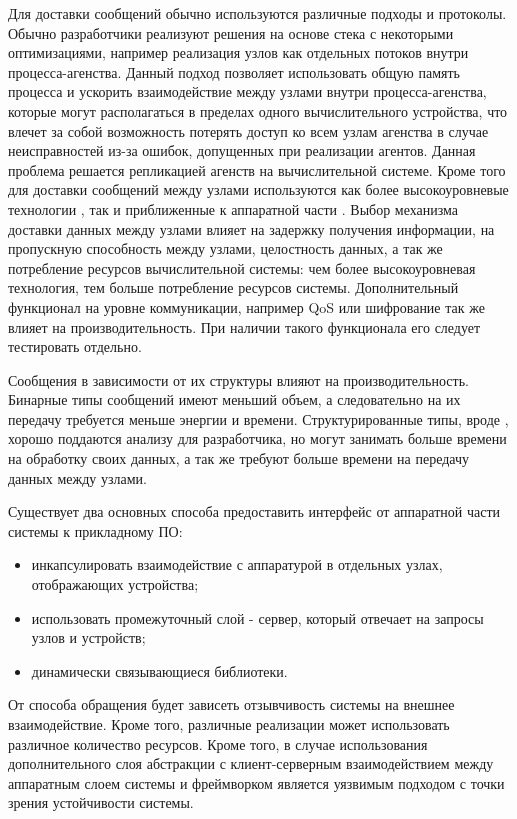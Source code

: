 \begin{description}[noitemsep]
	\item [Протоколы коммуникации.] Для доставки сообщений обычно используются различные подходы и протоколы. Обычно разработчики реализуют решения на основе стека  с некоторыми оптимизациями, например реализация узлов как отдельных потоков внутри процесса-агенства. Данный подход позволяет использовать общую память процесса и ускорить взаимодействие между узлами внутри процесса-агенства, которые могут располагаться в пределах одного вычислительного устройства, что влечет за собой возможность потерять доступ ко всем узлам агенства в случае неисправностей из-за ошибок, допущенных при реализации агентов. Данная проблема решается репликацией агенств на вычислительной системе. Кроме того для доставки сообщений между узлами используются как более высокоуровневые технологии , так и приближенные к аппаратной части . Выбор механизма доставки данных между узлами влияет на задержку получения информации, на пропускную способность между узлами, целостность данных, а так же потребление ресурсов вычислительной системы: чем более высокоуровневая технология, тем больше потребление ресурсов системы. Дополнительный функционал на уровне коммуникации, например QoS или шифрование так же влияет на производительность. При наличии такого функционала его следует тестировать отдельно.

	\item [Формат сообщений.] Сообщения в зависимости от их структуры влияют на производительность. Бинарные типы сообщений имеют меньший объем, а следовательно на их передачу требуется меньше энергии и времени. Структурированные типы, вроде , хорошо поддаются анализу для разработчика, но могут занимать больше времени на обработку своих данных, а так же требуют больше времени на передачу данных между узлами.

	\item [Способ взаимодействия с аппаратурой.] Существует два основных способа предоставить интерфейс от аппаратной части системы к прикладному ПО:
	\begin{itemize}[noitemsep]
		\item инкапсулировать взаимодействие с аппаратурой в отдельных узлах, отображающих устройства;
		\item использовать промежуточный слой - сервер, который отвечает на запросы узлов и устройств;
		\item динамически связывающиеся библиотеки.
	\end{itemize}
	
	От способа обращения будет зависеть отзывчивость системы на внешнее взаимодействие. Кроме того, различные реализации может использовать различное количество ресурсов. Кроме того, в случае использования дополнительного слоя абстракции с клиент-серверным взаимодействием между аппаратным слоем системы и фреймворком является уязвимым подходом с точки зрения устойчивости системы.

\end{description}

